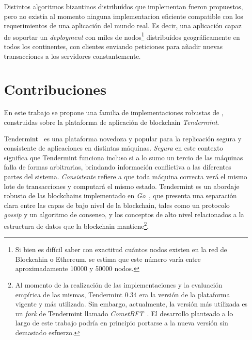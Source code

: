 %

Distintos algoritmos bizantinos distribuídos que implementan \setchain fueron
propuestos, pero no existía al momento ninguna implementacion eficiente compatible con
los requerimientos de una aplicación del mundo real.
Es decir, una aplicación capaz de soportar un \textit{deployment} con miles de nodos\footnote{Si bien
es difícil saber con exactitud cuántos nodos existen en la red de Blockcahin o Ethereum, se estima
que este número varía entre aproximadamente 10000 y 50000 nodos.}
distribuídos geográficamente en todos los continentes, con clientes enviando peticiones para
añadir nuevas transacciones a los servidores constantemente.

\section{Contribuciones}
En este trabajo se propone una familia de implementaciones robustas de \setchain,
construidas sobre la plataforma de aplicación de blockchain \textit{Tendermint}.



Tendermint~\cite{Buchman.2018.Tendermint} es una plataforma novedoza y popular para la
replicación segura y consistente de aplicaciones en distintas máquinas.
%
\textit{Segura} en este contexto significa que Tendermint funciona incluso si a lo sumo
un tercio de las máquinas falla de formas arbitrarias, brindando información conflictiva
a las diferentes partes del sistema.
%
\textit{Consistente} refiere a que toda máquina correcta verá el mismo lote de
transacciones y computará el mismo estado.
%
Tendermint es un abordaje robusto de las blockchains implementado
en \emph{Go}~\cite{donovan15go}, que presenta una separación clara entre las
capas de bajo nivel de la blockchain,
tales como un protocolo \textit{gossip} y un algoritmo de consenso, y los conceptos de alto
nivel relacionados a la estructura de datos que la blockchain mantiene\footnote{Al momento
de la realización de las implementaciones y la evaluación empírica de las mismas,
Tendermint 0.34 era la versión de la plataforma vigente y más utilizada. Sin embargo,
actualmente, la versión más utilizada es un \textit{fork} de Tendermint llamado \textit{CometBFT}~\cite{cometbft.repo}.
El desarrollo planteado a lo largo de este trabajo podría en principio portarse a la nueva versión sin demasiado esfuerzo.}.

